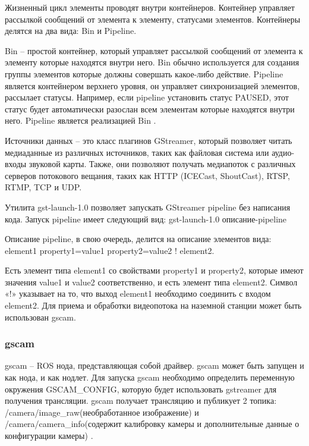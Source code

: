 Жизненный цикл элементы проводят внутри контейнеров. Контейнер управляет рассылкой сообщений от элемента к элементу, статусами элементов. Контейнеры делятся на два вида: Bin и Pipeline.

Bin -- простой контейнер, который управляет рассылкой сообщений от элемента к элементу которые находятся внутри него. Bin обычно используется для создания группы элементов которые должны совершать какое-либо действие. 
Pipeline является контейнером верхнего уровня, он управляет синхронизацией элементов, рассылает статусы. Например, если pipeline установить статус PAUSED, этот статус будет автоматически разослан всем элементам которые находятся внутри него. Pipeline является реализацией Bin \cite{gstreamer}. 

Источники данных -- это класс плагинов GStreamer, который позволяет читать медиаданные из различных источников, таких как файловая система или аудио-входы звуковой карты. Также, они позволяют получать медиапоток с различных серверов потокового вещания, таких как HTTP (ICECast, ShoutCast), RTSP, RTMP, TCP и UDP. 

Утилита gst-launch-1.0 позволяет запускать GStreamer pipeline без написания кода. Запуск pipeline имеет следующий вид:
gst-launch-1.0 описание-pipeline

Описание pipeline, в свою очередь, делится на описание элементов вида:
element1 property1=value1 property2=value2 ! element2.

Есть элемент типа element1 со свойствами property1 и property2, которые имеют значения value1 и value2 соответственно, и есть элемент типа element2. Символ «!» указывает на то, что выход element1 необходимо соединить с входом element2.
Для приема и обработки видеопотока на наземной станции может быть использован gscam.

\subsubsection{gscam}
gscam -- ROS нода, представляющая собой драйвер. gscam может быть запущен и как нода, и как нодлет.
Для запуска gscam необходимо определить переменную окружения GSCAM\_CONFIG, которую будет использовать  gstreamer для получения трансляции. %
gscam получает трансляцию и публикует 2 топика: /camera/image\_raw(необработанное изображение) и /camera/camera\_info(содержит калибровку камеры и дополнительные данные о конфигурации камеры) \cite{ros}.

